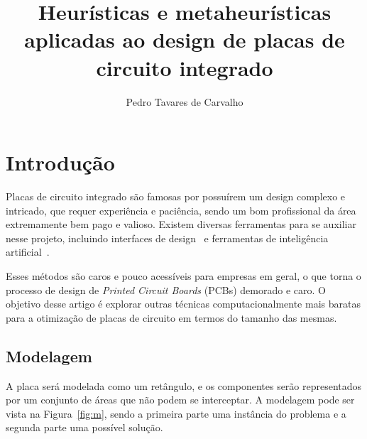 \documentclass[12pt]{article}
\title{Heurísticas e metaheurísticas aplicadas ao design de placas de circuito integrado}
\author{Pedro Tavares de Carvalho}
\affil{DCC - UFMG}
\date{}
\begin{document}
    \maketitle
    \newpage
    \section{Introdução} %
    \label{sec:Introdução}
        Placas de circuito integrado são famosas por possuírem um design complexo e intricado, que requer experiência e paciência,
        sendo um bom profissional da área extremamente bem pago e valioso. Existem diversas ferramentas para se auxiliar nesse projeto,
        incluindo interfaces de design~\cite{orcad} e ferramentas de inteligência artificial~\cite{PCBAI}.

        Esses métodos são caros e pouco acessíveis para empresas em geral, o que torna o processo de design de \textit{Printed Circuit Boards} (PCBs) demorado e caro. O
        objetivo desse artigo é explorar outras técnicas computacionalmente mais baratas para a otimização de placas de circuito em
        termos do tamanho das mesmas.

        \subsection{Modelagem} %
        \label{sub:Modelagem}
        A placa será modelada como um retângulo, e os componentes serão representados por um conjunto de áreas que não podem se interceptar. A modelagem pode ser vista na Figura~\ref{fig:m},
        sendo a primeira parte uma instância do problema e a segunda parte uma possível solução.
\end{document}
